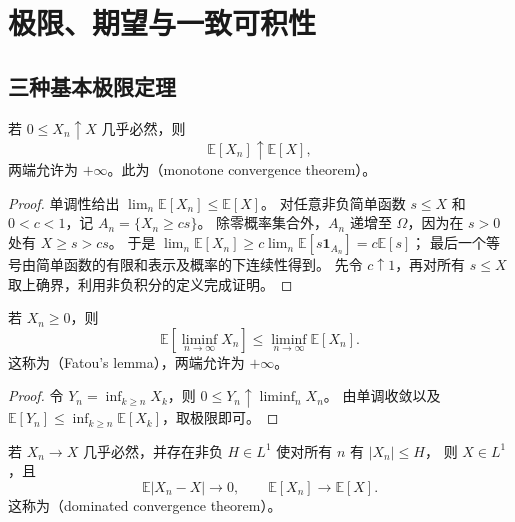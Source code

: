 \documentclass[UTF8]{ctexart}
\begin{document}
\section{极限、期望与一致可积性}
\label{sec:expectation-limits}

\subsection{三种基本极限定理}

\begin{theorem}[单调收敛定理]
\label{thm:expectation-mct}
若 $0\leq X_n\uparrow X$ 几乎必然，则
\[
  \mathbb E[X_n]\uparrow\mathbb E[X],
\]
两端允许为 $+\infty$。此为（monotone convergence theorem）。
\end{theorem}

\begin{proof}
单调性给出 $\lim_n\mathbb E[X_n]\leq\mathbb E[X]$。
对任意非负简单函数 $s\leq X$ 和 $0<c<1$，记 $A_n=\{X_n\geq cs\}$。
除零概率集合外，$A_n$ 递增至 $\Omega$，因为在 $s>0$ 处有 $X\geq s>cs$。
于是
$\lim_n\mathbb E[X_n]\geq c\lim_n\mathbb E[s\mathbf1_{A_n}]=c\mathbb E[s]$；
最后一个等号由简单函数的有限和表示及概率的下连续性得到。
先令 $c\uparrow1$，再对所有 $s\leq X$ 取上确界，利用非负积分的定义完成证明。
\end{proof}

\begin{theorem}[Fatou 引理]
\label{thm:expectation-fatou}
若 $X_n\geq0$，则
\begin{equation}
  \mathbb E[\liminf_{n\to\infty}X_n]
  \leq\liminf_{n\to\infty}\mathbb E[X_n].
  \label{eq:expectation-fatou}
\end{equation}
这称为（Fatou's lemma），两端允许为 $+\infty$。
\end{theorem}

\begin{proof}
令 $Y_n=\inf_{k\geq n}X_k$，则 $0\leq Y_n\uparrow\liminf_nX_n$。
由单调收敛以及
$\mathbb E[Y_n]\leq\inf_{k\geq n}\mathbb E[X_k]$，取极限即可。
\end{proof}

\begin{theorem}[控制收敛定理]
\label{thm:expectation-dct}
若 $X_n\to X$ 几乎必然，并存在非负 $H\in L^1$ 使对所有 $n$ 有 $|X_n|\leq H$，
则 $X\in L^1$，且
\[
  \mathbb E|X_n-X|\longrightarrow0,
  \qquad
  \mathbb E[X_n]\longrightarrow\mathbb E[X].
\]
这称为（dominated convergence theorem）。
\end{theorem}
\end{document}
